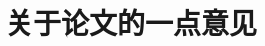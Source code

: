 
\title{关于论文的一点意见}
\renewcommand*{\Authfont}{\small\rm} %
\renewcommand*{\Affilfont}{\small\it} %
\renewcommand\Authands{ and } %
\renewcommand\Authands{ , } %
\date{} %


